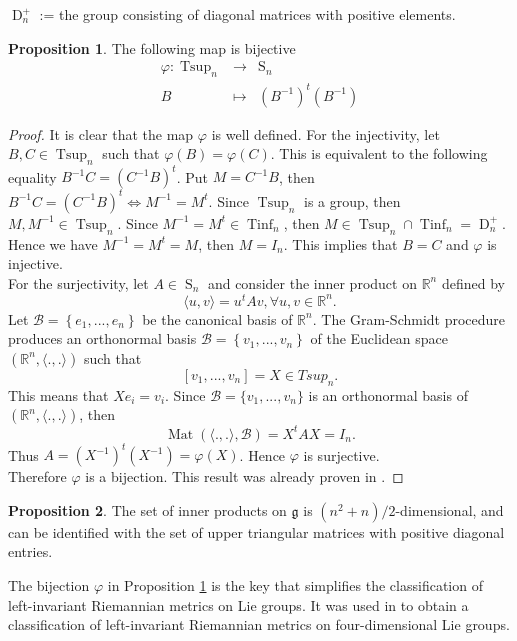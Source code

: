 \documentclass[12pt,a4paper,twoside]{article}
\theoremstyle{definition}
\newtheorem{proposition}{Proposition}[section]
\begin{document}
$\operatorname{D}_n^{+}$ := the group consisting of diagonal matrices with positive elements.
\begin{proposition} \label{bijection}
The following map is bijective
$$ \begin{array}{rcl}
\varphi : \operatorname{Tsup}_{n}&\longrightarrow& \operatorname{S}_{n}\\
B &\longmapsto& (B^{-1})^t(B^{-1})
\end{array} $$
\end{proposition}
\begin{proof}
It is clear that the map $\varphi$ is well defined. For the injectivity, let $B, C \in \operatorname{Tsup}_{n}$ such that $\varphi(B) = \varphi(C)$. This is equivalent to the following equality $B^{-1}C = (C^{-1}B)^{t}$. Put $M = C^{-1}B$, then 
$B^{-1}C = (C^{-1}B)^{t} \Leftrightarrow M^{-1} = M^{t}$. Since $\operatorname{Tsup}_{n}$ is a group, then $M, M^{-1} \in \operatorname{Tsup}_{n}$. Since $M^{-1} = M^{t} \in \operatorname{Tinf}_n$, then $M \in \operatorname{Tsup}_n \cap \operatorname{Tinf}_n = \operatorname{D}_n^{+}$. Hence we have $M^{-1} = M^{t} = M$, then $M = I_n$. This implies that $B = C$ and $\varphi$ is injective.\\
For the surjectivity, let $A \in \operatorname{S}_{n}$ and consider the inner product on $\mathbb{R}^{n}$ defined by 
$$\langle u, v\rangle = u^{t}Av, \forall u, v \in \mathbb{R}^{n}.$$
Let $\mathcal{B} = \left\lbrace e_1, ..., e_n\right\rbrace$ be the canonical basis of $\mathbb{R}^{n}$. The Gram-Schmidt procedure produces an orthonormal basis $\mathscr{B} = \left\lbrace v_1, ..., v_n\right\rbrace$ of the Euclidean space $\left( \mathbb{R}^{n}, \langle ., .\rangle\right)$ such that
$$[v_1, ..., v_n] = X \in Tsup_n.$$
This means that $Xe_i = v_i$. Since $\mathscr{B} = \{v_1, ..., v_n\}$ is an orthonormal basis of $(\mathbb{R}^n, \langle ., . \rangle)$, then
$$\operatorname{Mat}\left(\langle ., .\rangle , \mathscr{B}\right) =X^tAX = I_n.$$
Thus $A = (X^{-1})^{t}(X^{-1}) = \varphi(X)$. Hence $\varphi$ is surjective.\\
Therefore $\varphi$ is a bijection. This result was already proven in \cite{van2017metrics}.
\end{proof}
\begin{proposition} \cite{van2017metrics} 
The set of inner products on $\mathfrak{g}$ is $(n^2 + n)/2$-dimensional, and can be identified with the set of upper triangular matrices with positive diagonal entries.
\end{proposition}
The bijection $\varphi$ in Proposition \ref{bijection} is the key that simplifies the classification of left-invariant Riemannian metrics on Lie groups. It was used in \cite{van2017metrics,aitbenhaddou2025classification} to obtain a classification of left-invariant Riemannian metrics on four-dimensional Lie groups.
\end{document}

